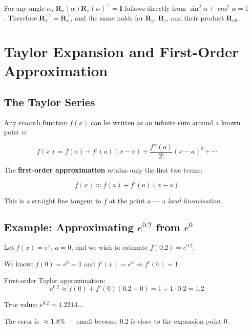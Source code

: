 \documentclass[12pt,a4paper]{article}
\begin{document}
{For any angle $\alpha$, $\bm{R}_x(\alpha)\bm{R}_x(\alpha)^{\top} = \bm{I}$
follows directly from $\sin^2\alpha + \cos^2\alpha = 1$. Therefore
$\bm{R}_x^{-1} = \bm{R}_x^{\top}$, and the same holds for $\bm{R}_y$,
$\bm{R}_z$, and their product $\bm{R}_{nb}$.

\section{Taylor Expansion and First-Order Approximation}
\label{app:taylor}

\subsection{The Taylor Series}

Any smooth function $f(x)$ can be written as an infinite sum around a
known point $a$:

\begin{equation}
  f(x) = f(a) + f'(a)(x-a) + \frac{f''(a)}{2!}(x-a)^2 + \cdots
\end{equation}

The \textbf{first-order approximation} retains only the first two terms:

\begin{equation}
  f(x) \approx f(a) + f'(a)(x - a)
  \label{eq:taylor1}
\end{equation}

This is a straight line tangent to $f$ at the point $a$ — a \emph{local
linearisation}.

\subsection{Example: Approximating \texorpdfstring{$e^{0.2}$}{e\^{}0.2} from \texorpdfstring{$e^{0}$}{e\^{}0}}

Let $f(x) = e^x$, $a = 0$, and we wish to estimate $f(0.2) = e^{0.2}$.

We know: $f(0) = e^0 = 1$ and $f'(x) = e^x \Rightarrow f'(0) = 1$.

First-order Taylor approximation:
\begin{equation}
  e^{0.2} \approx f(0) + f'(0)(0.2 - 0) = 1 + 1 \cdot 0.2 = 1.2
\end{equation}

True value: $e^{0.2} = 1.2214\ldots$

The error is $\approx 1.8\%$ — small because $0.2$ is close to the expansion
point $0$.

}
\end{document}
